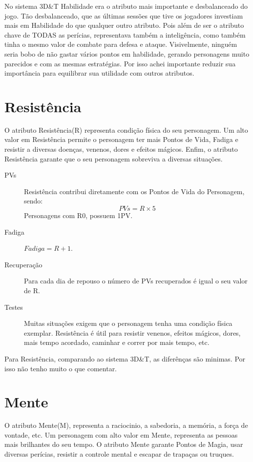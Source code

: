\begin{framed}
No sistema 3D\&T Habilidade era o atributo mais importante e desbalanceado do jogo. Tão desbalanceado, que as últimas sessões que tive os jogadores investiam mais em Habilidade do que qualquer outro atributo. Pois além de ser o atributo chave de TODAS as perícias, representava também a inteligência, como também tinha o mesmo valor de combate para defesa e ataque. Visivelmente, ninguém seria bobo de não gastar vários pontos em habilidade, gerando personagens muito parecidos e com as mesmas estratégias. Por isso achei importante reduzir sua importância para equilibrar sua utilidade com outros atributos.
\end{framed}

\section{Resistência}
O atributo Resistência(R) representa condição física do seu personagem. Um alto valor em Resistência permite o personagem ter mais Pontos de Vida, Fadiga e resistir a diversas doenças, venenos, dores e efeitos mágicos. Enfim, o atributo Resistência garante que o seu personagem sobreviva a diversas situações.

\begin{description}
\item[PVs] Resistência contribui diretamente com os Pontos de Vida do Personagem, sendo:
\[PVs = R \times 5 \]
Personagens com R0, possuem 1PV.
\item[Fadiga] \( Fadiga = R + 1 \).
\item[Recuperação] Para cada dia de repouso o número de PVs recuperados é igual o seu valor de R. 
\item[Testes] Muitas situações exigem que o personagem tenha uma condição física exemplar. Resistência é útil para resistir venenos, efeitos mágicos, dores, mais tempo acordado, caminhar e correr por mais tempo, etc.
\end{description}

\begin{framed}
Para Resistência, comparando ao sistema 3D\&T, as diferênças são minimas. Por isso não tenho muito o que comentar.
\end{framed}

\section{Mente}
O atributo Mente(M), representa a raciocinio, a sabedoria, a memória, a força de vontade, etc. Um personagem com alto valor em Mente, representa as pessoas mais brilhantes do seu tempo. O atributo Mente garante Pontos de Magia, usar diversas perícias, resistir a controle mental e escapar de trapaças ou truques.


